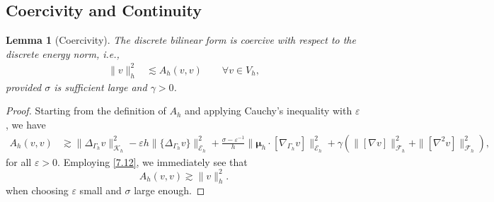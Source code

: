 \documentclass[10pt, a4paper]{amsart}
\newcommand{\bn}{{\bm n}}
\newcommand{\nab}{\nabla}
\newcommand{\bmu}{{\bm \mu}}
\newcommand{\calE}{\mathcal{E}}
\newcommand{\calF}{\mathcal{F}}
\newcommand{\calK}{\mathcal{K}}
\newtheorem{lemma}[theorem]{Lemma}
\theoremstyle{definition}
\theoremstyle{remark}
\theoremstyle{example}
\numberwithin{equation}{section}
\begin{document}
\subsection{Coercivity and Continuity}

\begin{lemma}[Coercivity]
The discrete bilinear form is coercive with respect to the discrete energy norm, i.e.,
\begin{align}
\|v\|_h^2
& \lesssim A_h(v, v) \qquad \forall v \in V_h, \label{3.11}
\end{align}
provided $\sigma$ is sufficient large and $\gamma>0$.
\end{lemma}

\begin{proof}
Starting from the definition of $A_h$ and applying Cauchy's inequality with $\varepsilon$, we have
\begin{align*}
A_h(v, v)
& \gtrsim \|\Delta_{\Gamma_h}v\|_{\calK_h}^2 - \varepsilon h\|\{\Delta_{\Gamma_h}v\}\|_{\calE_h}^2 + \frac{\sigma - \varepsilon^{-1}}{h}\|\bmu_h \cdot [\nab_{\Gamma_h}v]\|_{\calE_h}^2 +
\gamma(\|[\nab v]\|_{\calF_h}^2 + \|[\nab^2v]\|_{\calF_h}^2), %
\end{align*}
for all $\varepsilon>0$.
Employing \eqref{7.12}, we immediately see that
\[
A_h(v, v) \gtrsim \|v\|_h^2.
\]
when choosing $\varepsilon$ small and $\sigma$
large enough.
\end{proof}
\end{document}
